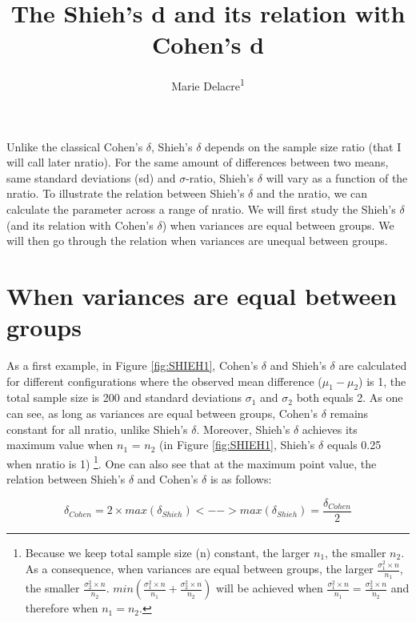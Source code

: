 \documentclass[man,floatsintext]{apa6}
\title{The Shieh's d and its relation with Cohen's d}
\author{Marie Delacre\textsuperscript{1}}
\date{}
\affiliation{
\vspace{0.5cm}
\textsuperscript{1} Service of Analysis of the Data, Université Libre de Bruxelles, Belgium}
\let\rmarkdownfootnote\footnote%
\def\footnote{\protect\rmarkdownfootnote}
\begin{document}
\maketitle

Unlike the classical Cohen's \(\delta\), Shieh's \(\delta\) depends on the sample size ratio (that I will call later nratio). For the same amount of differences between two means, same standard deviations (sd) and \(\sigma\)-ratio, Shieh's \(\delta\) will vary as a function of the nratio. To illustrate the relation between Shieh's \(\delta\) and the nratio, we can calculate the parameter across a range of nratio. We will first study the Shieh's \(\delta\) (and its relation with Cohen's \(\delta\)) when variances are equal between groups. We will then go through the relation when variances are unequal between groups.

\hypertarget{when-variances-are-equal-between-groups}{%
\section{When variances are equal between groups}\label{when-variances-are-equal-between-groups}}

As a first example, in Figure \ref{fig:SHIEH1}, Cohen's \(\delta\) and Shieh's \(\delta\) are calculated for different configurations where the observed mean difference (\(\mu_{1}-\mu_{2}\)) is 1, the total sample size is 200 and standard deviations \(\sigma_{1}\) and \(\sigma_{2}\) both equals 2. As one can see, as long as variances are equal between groups, Cohen's \(\delta\) remains constant for all nratio, unlike Shieh's \(\delta\). Moreover, Shieh's \(\delta\) achieves its maximum value when \(n_{1}\) = \(n_{2}\) (in Figure \ref{fig:SHIEH1}, Shieh's \(\delta\) equals 0.25 when nratio is 1) \footnote{Because we keep total sample size (n) constant, the larger $n_{1}$, the smaller $n_{2}$. As a consequence, when variances are equal between groups, the larger $\frac{\sigma^2_{1} \times n}{n_{1}}$, the smaller $\frac{\sigma^2_{2} \times n}{n_{2}}$.  $min(\frac{\sigma^2_{1} \times n}{n_{1}}+\frac{\sigma^2_{2} \times n}{n_{2}})$ will be achieved when $\frac{\sigma^2_{1} \times n}{n_{1}}=\frac{\sigma^2_{2} \times n}{n_{2}}$ and therefore when $n_{1}=n_{2}$.}. One can also see that at the maximum point value, the relation between Shieh's \(\delta\) and Cohen's \(\delta\) is as follows:

\begin{equation} 
\delta_{Cohen}=2 \times max(\delta_{Shieh})  
<-->  max(\delta_{Shieh}) = \frac{\delta_{Cohen}}{2}
\label{eq:cohenshieh}
\end{equation}
\end{document}
